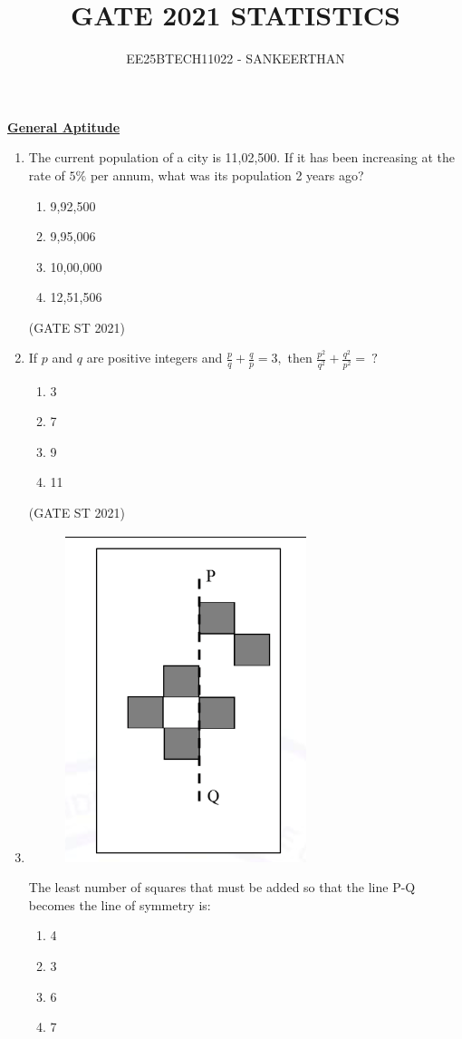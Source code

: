 \documentclass[journal,12pt,onecolumn]{IEEEtran}
\title{GATE 2021 STATISTICS}
\author{EE25BTECH11022 - SANKEERTHAN }
\date{}
\theoremstyle{remark}
\begin{document}
\maketitle
\textbf{\underline{General Aptitude}}

\begin{enumerate}
\item 
The current population of a city is 11,02,500. If it has been increasing at the rate of $5\%$ per annum, what was its population 2 years ago?

\begin{enumerate}
\item 9,92,500
\item 9,95,006
\item 10,00,000
\item 12,51,506
\end{enumerate}

\hfill (GATE ST 2021)\\

\item If $p$ and $q$ are positive integers and
$
\frac{p}{q} + \frac{q}{p} = 3,
$
then
$
\frac{p^{2}}{q^{2}} + \frac{q^{2}}{p^{2}} = \ ?
$
\begin{enumerate}
\item 3
\item 7
\item 9
\item 11
\end{enumerate}

\hfill (GATE ST 2021) 


\item 

\begin{figure}[h]
    \centering
    \includegraphics[width=0.2\linewidth]{figs/3.png}
    \caption{}
    \label{fig:1}
\end{figure}

The least number of squares that must be added so that the line P-Q becomes the line of symmetry is:

\begin{enumerate}
\item 4
\item 3
\item 6
\item 7
\end{enumerate}


\end{enumerate}
\end{document}
